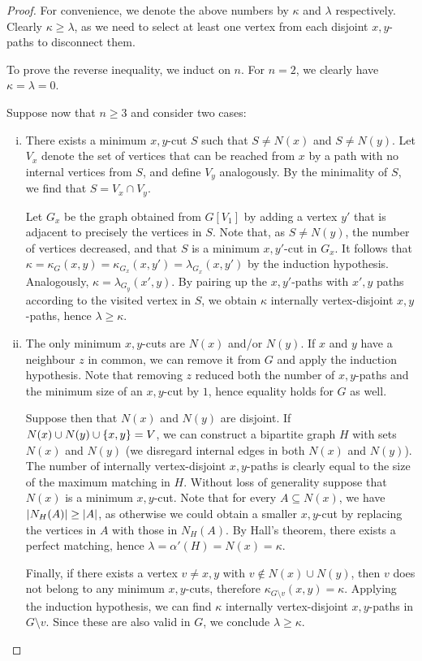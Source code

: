 \begin{proof}
For convenience, we denote the above numbers by $\kappa$ and
$\lambda$ respectively. Clearly $\kappa \geq \lambda$, as we need
to select at least one vertex from each disjoint $x,y$-paths to
disconnect them.

To prove the reverse inequality, we induct on $n$. For $n = 2$, we
clearly have $\kappa = \lambda = 0$.

Suppose now that $n \geq 3$ and consider two cases:

\begin{enumerate}[i)]
\item There exists a minimum $x,y$-cut $S$ such that $S \ne N(x)$
and $S \ne N(y)$. Let $V_x$ denote the set of vertices that can be
reached from $x$ by a path with no internal vertices from $S$, and
define $V_y$ analogously. By the minimality of $S$, we find that
$S = V_x \cap V_y$.

Let $G_x$ be the graph obtained from $G[V_1]$ by adding a vertex
$y'$ that is adjacent to precisely the vertices in $S$. Note that,
as $S \ne N(y)$, the number of vertices decreased, and that $S$ is
a minimum $x,y'$-cut in $G_x$. It follows that
$\kappa = \kappa_G(x,y) = \kappa_{G_x}(x,y') = \lambda_{G_x}(x,y')$
by the induction hypothesis. Analogously,
$\kappa = \lambda_{G_y}(x',y)$. By pairing up the $x,y'$-paths with
$x',y$ paths according to the visited vertex in $S$, we obtain
$\kappa$ internally vertex-disjoint $x,y$-paths, hence
$\lambda \geq \kappa$.

\item The only minimum $x,y$-cuts are $N(x)$ and/or $N(y)$. If $x$
and $y$ have a neighbour $z$ in common, we can remove it from $G$
and apply the induction hypothesis. Note that removing $z$ reduced
both the number of $x,y$-paths and the minimum size of an $x,y$-cut
by $1$, hence equality holds for $G$ as well.

Suppose then that $N(x)$ and $N(y)$ are disjoint. If
$N(x) \cup N(y) \cup \left\{x,y\right\} = V$, we can construct a bipartite
graph $H$ with sets $N(x)$ and $N(y)$ (we disregard internal edges
in both $N(x)$ and $N(y)$). The number of internally
vertex-disjoint $x,y$-paths is clearly equal to the size of the
maximum matching in $H$. Without loss of generality suppose that
$N(x)$ is a minimum $x,y$-cut. Note that for every
$A \subseteq N(x)$, we have $\left\lvert N_H(A)\right\rvert \geq \left\lvert A\right\rvert$, as
otherwise we could obtain a smaller $x,y$-cut by replacing the
vertices in $A$ with those in $N_H(A)$. By Hall's theorem, there
exists a perfect matching, hence
$\lambda = \alpha'(H) = N(x) = \kappa$.

Finally, if there exists a vertex $v \ne x, y$ with
$v \not \in N(x) \cup N(y)$, then $v$ does not belong to any
minimum $x,y$-cuts, therefore
$\kappa_{G \setminus v}(x,y) = \kappa$. Applying the induction
hypothesis, we can find $\kappa$ internally vertex-disjoint
$x,y$-paths in $G \setminus v$. Since these are also valid in $G$,
we conclude $\lambda \geq \kappa$. \qedhere
\end{enumerate}
\end{proof}

